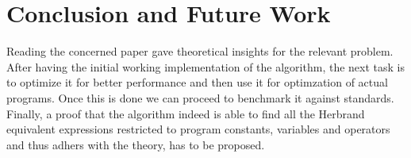 \chapter{Conclusion and Future Work}

Reading the concerned paper gave theoretical insights
for the relevant problem. After having the initial working 
implementation of the algorithm, the next task is to optimize it for 
better performance and then use it for optimzation of actual programs.
Once this is done we can proceed to benchmark it against standards.
Finally, a proof that the algorithm indeed is able to find all the 
Herbrand equivalent expressions restricted to program constants, 
variables and operators and thus adhers with the theory, 
has to be proposed.
